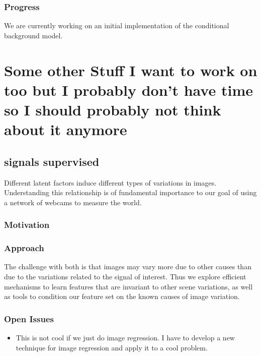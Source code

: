 \subsubsection{Progress}

We are currently working on an initial implementation of the
conditional background model.

\section{Some other Stuff I want to work on too but I probably
don't have time so I should probably not think about it anymore}

%
%
%
\subsection{signals supervised}
\label{sec:signals}

Different latent factors induce different types of variations in
images.  Understanding this relationship is of fundamental importance
to our goal of using a network of webcams to measure the world.


\subsubsection{Motivation}

\subsubsection{Approach}

The challenge with both is that images may vary more due to other
causes than due to the variations related to the signal of interest.
Thus we explore efficient mechanisms to learn features that are
invariant to other scene variations, as well as tools to condition our
feature set on the known causes of image variation.

\subsubsection{Open Issues}

\begin{itemize}

  \item This is not cool if we just do image regression.  I have to
    develop a new technique for image regression and apply it to a
    cool problem.
    
\end{itemize}


